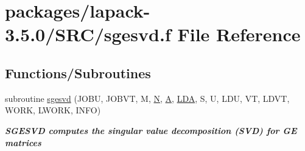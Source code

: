 \hypertarget{sgesvd_8f}{}\section{packages/lapack-\/3.5.0/\+S\+R\+C/sgesvd.f File Reference}
\label{sgesvd_8f}
\subsection*{Functions/\+Subroutines}
\begin{DoxyCompactItemize}
\item 
subroutine \hyperlink{group__realGEsing_gaf03d06284b1bfabd3d6c0f6955960533}{sgesvd} (J\+O\+B\+U, J\+O\+B\+V\+T, M, \hyperlink{polmisc_8c_a0240ac851181b84ac374872dc5434ee4}{N}, \hyperlink{classA}{A}, \hyperlink{example__user_8c_ae946da542ce0db94dced19b2ecefd1aa}{L\+D\+A}, S, U, L\+D\+U, V\+T, L\+D\+V\+T, W\+O\+R\+K, L\+W\+O\+R\+K, I\+N\+F\+O)
\begin{DoxyCompactList}\small\item\em {\bfseries  S\+G\+E\+S\+V\+D computes the singular value decomposition (S\+V\+D) for G\+E matrices} \end{DoxyCompactList}\end{DoxyCompactItemize}

